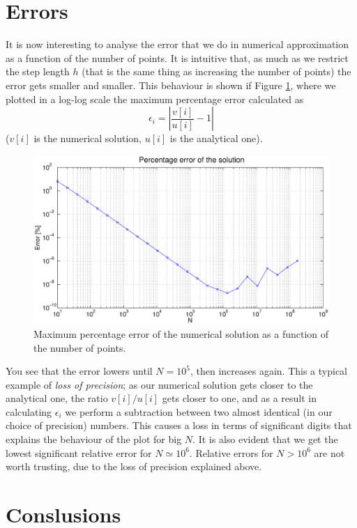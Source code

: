 \documentclass {article}
\begin{document}
\section{Errors}
It is now interesting to analyse the error that we do in numerical approximation as a function of the number of points. It is intuitive that, as much as we restrict the step length $h$ (that is the same thing as increasing the number of points) the error gets smaller and smaller. This behaviour is shown if Figure \ref{fig:errors}, where we plotted in a log-log scale the maximum percentage error calculated as
\begin{equation*}
	\epsilon_i = \left| \frac{v[i]}{u[i]} - 1 \right|
\end{equation*}
($v[i]$ is the numerical solution, $u[i]$ is the analytical one).
\begin{figure}[H]
	\centering
	\includegraphics[width=\textwidth]{errors}
	\caption{Maximum percentage error of the numerical solution as a function of the number of points.}
	\label{fig:errors}
\end{figure} 
You see that the error lowers until $N = 10^{5}$, then increases again. This a typical example of \emph{loss of precision}; as our numerical solution gets closer to the analytical one, the ratio $v[i]/u[i]$ gets closer to one, and as a result in calculating $\epsilon_i$ we perform a subtraction between two almost identical (in our choice of precision) numbers. This causes a loss in terms of significant digits that explains the behaviour of the plot for big $N$. It is also evident that we get the lowest significant relative error for $N \simeq 10^{6}$. Relative errors for $N > 10^{6}$ are not worth trusting, due to the loss of precision explained above.

\section{Conslusions}
\end{document}
